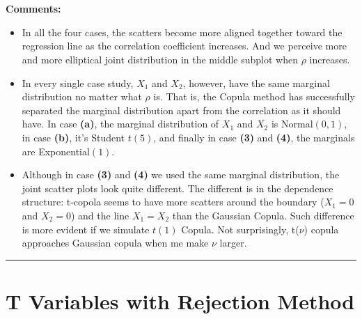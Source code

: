 \documentclass[11pt]{article}
\begin{document}
    \begin{center}
    \end{center}
    { \hspace*{\fill} \\}
    
    \begin{center}
    \end{center}
    { \hspace*{\fill} \\}
    \textbf{Comments:}
    \begin{itemize}
        \item In all the four cases, the scatters become more aligned together toward the regression line as the correlation coefficient increases. And we perceive more and more elliptical joint distribution in the middle subplot when $\rho$ increases.
        \item In every single case study, $X_1$ and $X_2$, however, have the same marginal distribution no matter what $\rho$ is. That is, the Copula method has successfully separated the marginal distribution apart from the correlation as it should have. In case \textbf{(a)}, the marginal distribution of $X_1$ and $X_2$ is Normal$(0,1)$, in case \textbf{(b)}, it's Student $t(5)$, and finally in case \textbf{(3)} and \textbf{(4)}, the marginals are Exponential$(1)$.
        \item Although in case \textbf{(3)} and \textbf{(4)} we used the same marginal distribution, the joint scatter plots look quite different. The different is in the dependence structure: t-copola seems to have more scatters around the boundary ($X_1 = 0$ and $X_2=0$) and the line $X_1=X_2$ than the Gaussian Copula. Such difference is more evident if we simulate $t(1)$ Copula. Not surprisingly, t($\nu$) copula approaches Gaussian copula when me make $\nu$ larger.
    \end{itemize}
    
    \noindent\rule{16cm}{0.4pt}
    \section{T Variables with Rejection
Method}\label{t-variables-with-rejection-method}
\end{document}
